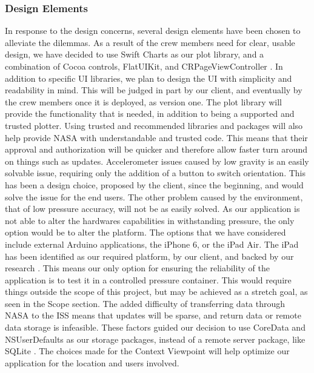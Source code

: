 \documentclass[onecolumn, draftclsnofoot,10pt, compsoc]{IEEEtran}
\begin{document}
\subsubsection{Design Elements}
In response to the design concerns, several design elements have been chosen to alleviate the dilemmas.
As a result of the crew members need for clear, usable design, we have decided to use Swift Charts as our plot library, and a combination of Cocoa controls, FlatUIKit, and  CRPageViewController \cite{techDocRaichart}.
In addition to specific UI libraries, we plan to design the UI with simplicity and readability in mind.
This will be judged in part by our client, and eventually by the crew members once it is deployed, as version one.
The plot library will provide the functionality that is needed, in addition to being a supported and trusted plotter.
Using trusted and recommended libraries and packages will also help provide NASA with understandable and trusted code.
This means that their approval and authorization will be quicker and therefore allow faster turn around on things such as updates.
Accelerometer issues caused by low gravity is an easily solvable issue, requiring only the addition of a button to switch orientation.
This has been a design choice, proposed by the client, since the beginning, and would solve the issue for the end users.
The other problem caused by the environment, that of low pressure accuracy, will not be as easily solved.
As our application is not able to alter the hardwares capabilities in withstanding pressure, the only option would be to alter the platform.
The options that we have considered include external Arduino applications, the iPhone 6, or the iPad Air.
The iPad has been identified as our required platform, by our client, and backed by our research \cite{techDocRaichart}.
This means our only option for ensuring the reliability of the application is to test it in a controlled pressure container.
This would require things outside the scope of this project, but may be achieved as a stretch goal, as seen in the Scope section.
The added difficulty of transferring data through NASA to the ISS means that updates will be sparse, and return data or remote data storage is infeasible.
These factors guided our decision to use CoreData and NSUserDefaults as our storage packages, instead of a remote server package, like SQLite \cite{techDocShepherd}.
The choices made for the Context Viewpoint will help optimize our application for the location and users involved.
\end{document}
